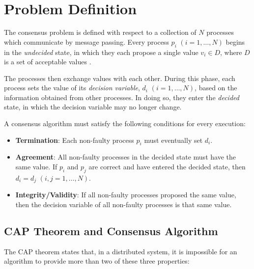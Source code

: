 \documentclass[12pt, a4paper]{article}
\begin{document}
\section{Problem Definition} \label{sec:consensus-def}

The consensus problem is defined with respect to a collection of $N$ processes
which communicate by message passing. Every process $p_{i}$ $(i = 1, \ldots, N)$
begins in the \textit{undecided} state, in which they each propose a single
value $v_{i} \in D$, where $D$ is a set of acceptable values
\cite{coulouris2005distributed}.

The processes then exchange values with each other. During this phase, each
process sets the value of its \textit{decision variable}, $d_i$ $(i = 1, \ldots,
N)$, based on the information obtained from other processes. In doing so, they
enter the \textit{decided} state, in which the decision variable may no longer
change.

A consensus algorithm must satisfy the following conditions for every execution:

\begin{itemize}
  \item \textbf{Termination}: Each non-faulty process $p_i$ must eventually set
    $d_i$.
  \item \textbf{Agreement}: All non-faulty processes in the decided state
    must have the same value. If $p_{i}$ and $p_{j}$ are correct and have
    entered the decided state, then $d_{i} = d_{j}$ $(i, j = 1, \ldots, N)$.
  \item \textbf{Integrity/Validity}: If all non-faulty processes proposed
    the same value, then the decision variable of all non-faulty processes is
    that same value.
\end{itemize}


\subsection{CAP Theorem and Consensus Algorithm}
\label{sec:cap-theorem}

The CAP theorem \cite{brewer2012cap} states that, in a distributed system, it is impossible for an algorithm to provide more than two of these three properties:
\end{document}

